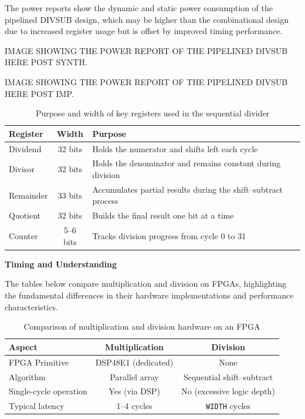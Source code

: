 \documentclass[a4paper,12pt]{article}
\begin{document}
The power reports show the dynamic and static power consumption of the pipelined DIVSUB design, which may be higher than the combinational design due to increased register usage but is offset by improved timing performance.

\begin{large}
    IMAGE SHOWING THE POWER REPORT OF THE PIPELINED DIVSUB HERE POST SYNTH.
\end{large} 

\begin{large}
    IMAGE SHOWING THE POWER REPORT OF THE PIPELINED DIVSUB HERE POST IMP.
\end{large}

\begin{table}[h]
\centering
\begin{tabular}{l c l}
\hline
\textbf{Register} & \textbf{Width} & \textbf{Purpose} \\
\hline
Dividend  & 32 bits & Holds the numerator and shifts left each cycle \\
Divisor   & 32 bits & Holds the denominator and remains constant during division \\
Remainder & 33 bits & Accumulates partial results during the shift--subtract process \\
Quotient  & 32 bits & Builds the final result one bit at a time \\
Counter   & 5--6 bits & Tracks division progress from cycle 0 to 31 \\
\hline
\end{tabular}
\caption{Purpose and width of key registers used in the sequential divider}
\end{table}

\textbf{Timing and Understanding}

The tables below compare multiplication and division on FPGAs, highlighting the fundamental differences in their hardware implementations and performance characteristics.

\begin{table}[h]
\centering
\begin{tabular}{l c c}
\hline
\textbf{Aspect} & \textbf{Multiplication} & \textbf{Division} \\
\hline
FPGA Primitive & DSP48E1 (dedicated) & None \\
Algorithm & Parallel array & Sequential shift--subtract \\
Single-cycle operation & Yes (via DSP) & No (excessive logic depth) \\
Typical latency & 1--4 cycles & \texttt{WIDTH} cycles \\
\hline
\end{tabular}
\caption{Comparison of multiplication and division hardware on an FPGA}
\end{table}
\end{document}
